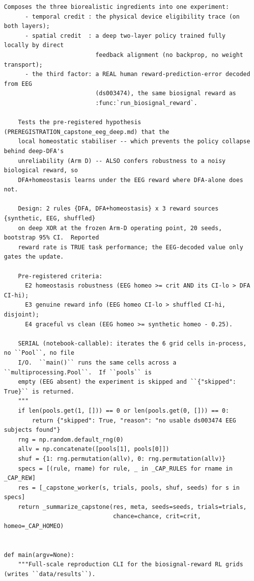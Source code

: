 \begin{lstlisting}[caption={mrl\_trace/biosignal.py},label={lst:siox-src-biosignal}]
    Composes the three biorealistic ingredients into one experiment:
      - temporal credit : the physical device eligibility trace (on both layers);
      - spatial credit  : a deep two-layer policy trained fully locally by direct
                          feedback alignment (no backprop, no weight transport);
      - the third factor: a REAL human reward-prediction-error decoded from EEG
                          (ds003474), the same biosignal reward as
                          :func:`run_biosignal_reward`.

    Tests the pre-registered hypothesis (PREREGISTRATION_capstone_eeg_deep.md) that the
    local homeostatic stabiliser -- which prevents the policy collapse behind deep-DFA's
    unreliability (Arm D) -- ALSO confers robustness to a noisy biological reward, so
    DFA+homeostasis learns under the EEG reward where DFA-alone does not.

    Design: 2 rules {DFA, DFA+homeostasis} x 3 reward sources {synthetic, EEG, shuffled}
    on deep XOR at the frozen Arm-D operating point, 20 seeds, bootstrap 95% CI.  Reported
    reward rate is TRUE task performance; the EEG-decoded value only gates the update.

    Pre-registered criteria:
      E2 homeostasis robustness (EEG homeo >= crit AND its CI-lo > DFA CI-hi);
      E3 genuine reward info (EEG homeo CI-lo > shuffled CI-hi, disjoint);
      E4 graceful vs clean (EEG homeo >= synthetic homeo - 0.25).

    SERIAL (notebook-callable): iterates the 6 grid cells in-process, no ``Pool``, no file
    I/O.  ``main()`` runs the same cells across a ``multiprocessing.Pool``.  If ``pools`` is
    empty (EEG absent) the experiment is skipped and ``{"skipped": True}`` is returned.
    """
    if len(pools.get(1, [])) == 0 or len(pools.get(0, [])) == 0:
        return {"skipped": True, "reason": "no usable ds003474 EEG subjects found"}
    rng = np.random.default_rng(0)
    allv = np.concatenate([pools[1], pools[0]])
    shuf = {1: rng.permutation(allv), 0: rng.permutation(allv)}
    specs = [(rule, rname) for rule, _ in _CAP_RULES for rname in _CAP_REW]
    res = [_capstone_worker(s, trials, pools, shuf, seeds) for s in specs]
    return _summarize_capstone(res, meta, seeds=seeds, trials=trials,
                               chance=chance, crit=crit, homeo=_CAP_HOMEO)


def main(argv=None):
    """Full-scale reproduction CLI for the biosignal-reward RL grids (writes ``data/results``).


\end{lstlisting}
